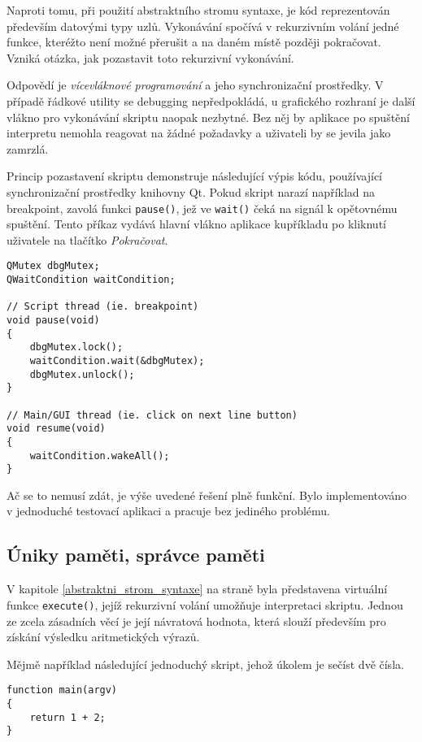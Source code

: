 \documentclass[11pt,twoside,a4paper]{book}
\begin{document}
Naproti tomu, při použití abstraktního stromu syntaxe, je kód reprezentován především datovými typy uzlů. Vykonávání spočívá v rekurzivním volání jedné funkce, kteréžto není možné přerušit a na daném místě později pokračovat. Vzniká otázka, jak pozastavit toto rekurzivní vykonávání.

Odpovědí je \textit{vícevláknové programování} a jeho synchronizační prostředky. V případě řádkové utility se debugging nepředpokládá, u grafického rozhraní je další vlákno pro vykonávání skriptu naopak nezbytné. Bez něj by aplikace po spuštění interpretu nemohla reagovat na žádné požadavky a uživateli by se jevila jako zamrzlá.

Princip pozastavení skriptu demonstruje následující výpis kódu, používající synchronizační prostředky knihovny Qt. Pokud skript narazí například na breakpoint, zavolá funkci \texttt{pause()}, jež ve \texttt{wait()} čeká na signál k opětovnému spuštění. Tento příkaz vydává hlavní vlákno aplikace kupříkladu po kliknutí uživatele na tlačítko \textit{Pokračovat}.

\begin{verbatim}
QMutex dbgMutex;
QWaitCondition waitCondition;

// Script thread (ie. breakpoint)
void pause(void)
{
    dbgMutex.lock();
    waitCondition.wait(&dbgMutex);
    dbgMutex.unlock();
}

// Main/GUI thread (ie. click on next line button)
void resume(void)
{
    waitCondition.wakeAll();
}
\end{verbatim}

Ač se to nemusí zdát, je výše uvedené řešení plně funkční. Bylo implementováno v jednoduché testovací aplikaci a pracuje bez jediného problému.


\subsection{Úniky paměti, správce paměti}

V kapitole \ref{abstraktni_strom_syntaxe} na straně \pageref{abstraktni_strom_syntaxe} byla představena virtuální funkce \texttt{execute()}, jejíž rekurzivní volání umožňuje interpretaci skriptu. Jednou ze zcela zásadních věcí je její návratová hodnota, která slouží především pro získání výsledku aritmetických výrazů.

Mějmě například následující jednoduchý skript, jehož úkolem je sečíst dvě čísla.

\begin{verbatim}
function main(argv)
{
    return 1 + 2;
}
\end{verbatim}
\end{document}
